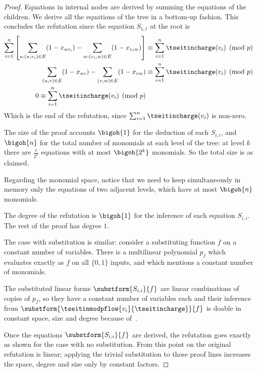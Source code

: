 \begin{proof}
  Equations in internal nodes are derived by summing the
  equations of the children. We derive all the equations of the tree
  in a bottom-up fashion. This concludes the refutation since the
  equation $S_{1,t}$ at the root is
  \begin{align}
    \sum^{n}_{i=1}
    \left[
    \sum_{u:(u,v_{i})\in E} (1-x_{uv_{i}}) -\sum_{w:(v_{i},w)\in E} (1-x_{v_{i}w})
    \right]
    & \equiv \sum^{n}_{i=1} \tseitincharge(v_{i}) \pmod{p}
    \\
    \sum_{(u,v)\in E} (1-x_{uv}) -\sum_{(v,w)\in E} (1-x_{vw})
    & \equiv \sum^{n}_{i=1} \tseitincharge(v_{i}) \pmod{p}\\
    0 \equiv \sum^{n}_{i=1} \tseitincharge(v_{i}) \pmod{p}
  \end{align}
  Which is the end of the refutation, since $\sum^{n}_{i=1} \tseitincharge(v_{i})$
  is non-zero.

  The size of the proof accounts $\bigoh{1}$ for the deduction of each $S_{i,i}$, and $\bigoh{n}$ for the total number of monomials at each level of the tree: at level $k$ there are $\frac{t}{2^{k}}$ equations with at most  $\bigoh{2^{k}}$ monomials. So the total size is as claimed.

  Regarding the monomial space, notice that we need to keep simultaneously in memory only the equations of two adjacent levels, which have at most $\bigoh{n}$ monomials.

  The degree of the refutation is $\bigoh{1}$ for the inference of each equation $S_{i,i}$. The rest of the proof has degree $1$.

  The case with substitution is similar: consider a substituting
  function $f$ on a constant number of variables. There is a
  multilinear polynomial $p_{f}$ which evaluates exactly as $f$ on all
  $\{0,1\}$ inputs, and which mentions a constant number of monomials.

  The substituted linear forms $\substform{S_{i,i}}{f}$ are linear
  combinations of copies of $p_{f}$, so they have a constant
  number of variables each and their inference from
  $\substform{\tseitinmodpflow{v_{i}}{\tseitincharge}}{f}$ is doable in constant
  space, size and degree because of~.

  Once the equations $\substform{S_{i,i}}{f}$ are derived, the
  refutation goes exactly as shown for the case with no
  substitution. From this point on the original refutation is linear;
  applying the trivial substitution to these proof lines increases the
  space, degree and size only by constant factors.
\end{proof}

